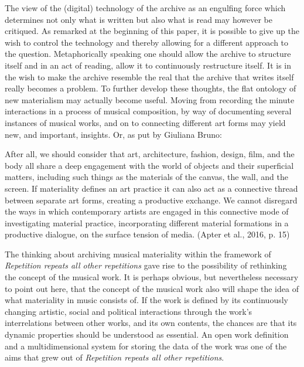 The view of the (digital) technology of the archive as an engulfing
force which determines not only what is written but also what is read
may however be critiqued. As remarked at the beginning of this paper, it
is possible to give up the wish to control the technology and thereby
allowing for a different approach to the question. Metaphorically
speaking one should allow the archive to structure itself and in an act
of reading, allow it to continuously restructure itself. It is in the
wish to make the archive resemble the real that the archive that writes
itself really becomes a problem. To further develop these thoughts, the
flat ontology of new materialism may actually become useful. Moving from
recording the minute interactions in a process of musical composition,
by way of documenting several instances of musical works, and on to
connecting different art forms may yield new, and important, insights.
Or, as put by Giuliana Bruno:

After all, we should consider that art, architecture, fashion, design,
film, and the body all share a deep engagement with the world of objects
and their superficial matters, including such things as the materials of
the canvas, the wall, and the screen. If materiality defines an art
practice it can also act as a connective thread between separate art
forms, creating a productive exchange. We cannot disregard the ways in
which contemporary artists are engaged in this connective mode of
investigating material practice, incorporating different material
formations in a productive dialogue, on the surface tension of media.
(Apter et al., 2016, p. 15)

The thinking about archiving musical materiality within the framework of
\emph{Repetition repeats all other repetitions} gave rise to the
possibility of rethinking the concept of the musical work. It is perhaps
obvious, but nevertheless necessary to point out here, that the concept
of the musical work also will shape the idea of what materiality in
music consists of. If the work is defined by its continuously changing
artistic, social and political interactions through the work's
interrelations between other works, and its own contents, the chances
are that its dynamic properties should be understood as essential. An
open work definition and a multidimensional system for storing the data
of the work was one of the aims that grew out of \emph{Repetition
repeats all other repetitions}.

